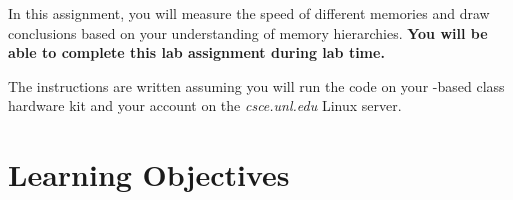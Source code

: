 



\usepackage{graphicx}

\usepackage{xparse}
\usepackage{tikz}
\usetikzlibrary{shadows}
\usepackage{lipsum}\usepackage{array,color,colortbl}


\NewDocumentCommand{}

\renewcommand{\labnumber}{\memorylabnumber}
\renewcommand{\labname}{Memory Measurement Lab}
\renewcommand{\shortlabname}{memorylab}
\renewcommand{\collaborationrules}{\memorylabcollaboration}
\renewcommand{\duedate}{\memorylabdue}
\newcommand{\nano}{\developmentboard} %
\renewcommand{\runtimeenvironment}{your \nano-based class hardware kit and your
account on the \textit{csce.unl.edu} Linux server}
\pagelayout

\labidentifier


In this assignment, you will measure the speed of different memories and draw
conclusions based on your understanding of memory hierarchies. \textbf{You will
be able to complete this lab assignment during lab time.}

The instructions are written assuming you will run the code on
\runtimeenvironment.

\section*{Learning Objectives}

